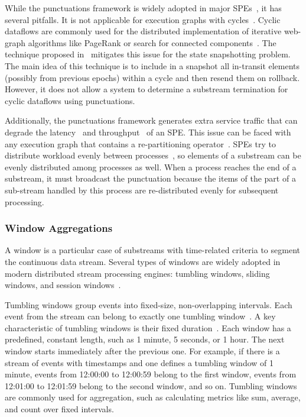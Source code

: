 While the punctuations framework is widely adopted in major SPEs~\cite{carbone2015apache, Noghabi:2017:SSS:3137765.3137770, Kulkarni:2015:THS:2723372.2742788}, it has several pitfalls. It is not applicable for execution graphs with cycles~\cite{carbone2018scalable}. Cyclic dataflows are commonly used for the distributed implementation of iterative web-graph algorithms like PageRank or search for connected components~\cite{ewen2012spinning, murray2016incremental, mcsherry2013differential}. The technique proposed in~\cite{Carbone:2017:SMA:3137765.3137777} mitigates this issue for the state snapshotting problem. The main idea of this technique is to include in a snapshot all in-transit elements (possibly from previous epochs) within a cycle and then resend them on rollback. However, it does not allow a system to determine a substream termination for cyclic dataflows using punctuations.

Additionally, the punctuations framework generates extra service traffic that can degrade the latency~\cite{DBLP:journals/pvldb/BegoliACHKKMS21} and throughput~\cite{Li:2008:OPN:1453856.1453890} of an SPE. This issue can be faced with any execution graph that contains a re-partitioning operator~\cite{trofimov2023bounding}. SPEs try to distribute workload evenly between processes~\cite{carbone2015apache, Kulkarni:2015:THS:2723372.2742788, Akidau:2013:MFS:2536222.2536229}, so elements of a substream can be evenly distributed among processes as well. When a process reaches the end of a substream, it must broadcast the punctuation because the items of the part of a sub-stream handled by this process are re-distributed evenly for subsequent processing.

\subsubsection{Window Aggregations}

A window is a particular case of substreams with time-related criteria to segment the continuous data stream. Several types of windows are widely adopted in modern distributed stream processing engines: tumbling windows, sliding windows, and session windows~\cite{verwiebe2023survey}.

Tumbling windows group events into fixed-size, non-overlapping intervals. Each event from the stream can belong to exactly one tumbling window~\cite{carbone2019stream}. A key characteristic of tumbling windows is their fixed duration~\cite{patroumpas2006window}. Each window has a predefined, constant length, such as 1 minute, 5 seconds, or 1 hour. The next window starts immediately after the previous one. For example, if there is a stream of events with timestamps and one defines a tumbling window of 1 minute, events from 12:00:00 to 12:00:59 belong to the first window, events from 12:01:00 to 12:01:59 belong to the second window, and so on. Tumbling windows are commonly used for aggregation, such as calculating metrics like sum, average, and count over fixed intervals.

